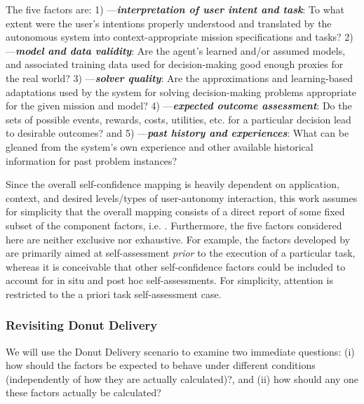     The five factors are: 1) \xI---\textit{\textbf{interpretation of user intent and task}}: To what extent were the user's intentions properly understood and translated by the autonomous system into context-appropriate mission specifications and tasks?  2) \xM---\textit{\textbf{model and data validity}}: Are the agent's learned and/or assumed models, and associated training data used for decision-making good enough proxies for the real world? 3) \xQ---\textit{\textbf{solver quality}}: Are the approximations and learning-based adaptations used by the system for solving decision-making problems appropriate for the given mission and model? 4) \xO---\textit{\textbf{expected outcome assessment}}: Do the sets of possible events, rewards, costs, utilities, etc. for a particular decision lead to desirable outcomes? and 5) \xP---\textit{\textbf{past history and experiences}}: What can be gleaned from the system's own experience and other available historical information for past problem instances? 

    Since the overall self-confidence mapping is heavily dependent on application, context, and desired levels/types of user-autonomy interaction, this work assumes for simplicity that the overall mapping consists of a direct report of some fixed subset of the component factors, i.e. \xSC. 
    Furthermore, the five factors considered here are neither exclusive nor exhaustive. For example, the factors developed by \cite{Aitken2016-cv,Aitken2016-fb} are primarily aimed at self-assessment \emph{prior} to the execution of a particular task, whereas it is conceivable that other self-confidence factors could be included to account for in situ and post hoc self-assessments. For simplicity, attention is restricted to the a priori task self-assessment case. 

\subsubsection{Revisiting Donut Delivery}
We will use the Donut Delivery scenario to examine two immediate questions: (i) how should the factors be expected to behave under different conditions (independently of how they are actually calculated)?, and (ii) how should any one these factors actually be calculated?

